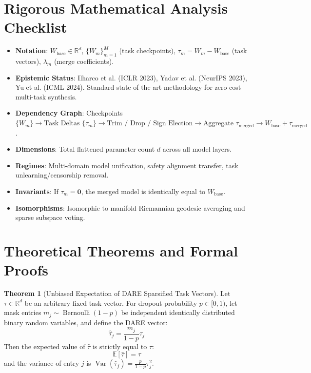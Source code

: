 \documentclass[11pt,a4paper]{article}
\theoremstyle{definition}
\newtheorem{theorem}{\textbf{Theorem}}[section]
\begin{document}
\section{Rigorous Mathematical Analysis Checklist}

\begin{itemize}
    \item \textbf{Notation}: $W_{\text{base}} \in \mathbb{R}^d$, $\{W_m\}_{m=1}^M$ (task checkpoints), $\tau_m = W_m - W_{\text{base}}$ (task vectors), $\lambda_m$ (merge coefficients).
    \item \textbf{Epistemic Status}: Ilharco et al. (ICLR 2023), Yadav et al. (NeurIPS 2023), Yu et al. (ICML 2024). Standard state-of-the-art methodology for zero-cost multi-task synthesis.
    \item \textbf{Dependency Graph}: Checkpoints $\{W_m\} \to \text{Task Deltas } \{\tau_m\} \to \text{Trim / Drop / Sign Election} \to \text{Aggregate } \tau_{\text{merged}} \to W_{\text{base}} + \tau_{\text{merged}}$.
    \item \textbf{Dimensions}: Total flattened parameter count $d$ across all model layers.
    \item \textbf{Regimes}: Multi-domain model unification, safety alignment transfer, task unlearning/censorship removal.
    \item \textbf{Invariants}: If $\tau_m = \mathbf{0}$, the merged model is identically equal to $W_{\text{base}}$.
    \item \textbf{Isomorphisms}: Isomorphic to manifold Riemannian geodesic averaging and sparse subspace voting.
\end{itemize}

\section{Theoretical Theorems and Formal Proofs}

\begin{theorem}[Unbiased Expectation of DARE Sparsified Task Vectors]
Let $\tau \in \mathbb{R}^d$ be an arbitrary fixed task vector. For dropout probability $p \in [0, 1)$, let mask entries $m_j \sim \operatorname{Bernoulli}(1 - p)$ be independent identically distributed binary random variables, and define the DARE vector:
{\boldmath
\begin{equation}
\hat{\tau}_j = \frac{m_j}{1 - p} \tau_j
\end{equation}
}
Then the expected value of $\hat{\tau}$ is strictly equal to $\tau$:
{\boldmath
\begin{equation}
\mathbb{E}[\hat{\tau}] = \tau
\end{equation}
}
and the variance of entry $j$ is $\operatorname{Var}(\hat{\tau}_j) = \frac{p}{1 - p} \tau_j^2$.
\end{theorem}
\end{document}
